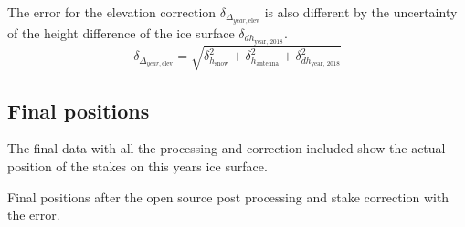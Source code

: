 The error for the elevation correction $\delta_{\Delta_{year, \text{elev}}}$ is also different by the uncertainty of the height difference of the ice surface $\delta_{dh_{\text{year, 2018}}}$.
\begin{equation}
	\delta_{\Delta_{year, \text{elev}}} = \sqrt{\delta_{h_{\text{snow}}}^2 + \delta_{h_{\text{antenna}}}^2 + \delta_{dh_{\text{year, 2018}}}^2}
\end{equation}

\subsection{Final positions}

The final data with all the processing and correction included show the actual position of the stakes on this years ice surface.

\begin{table}[H]
	\caption{Final positions after the open source post processing and stake correction with the error.}
	\centering
	
	\label{GPS:tab:os_tab}
\end{table}
